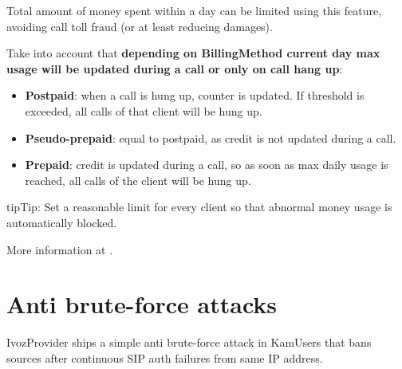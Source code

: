\documentclass[letterpaper,10pt,english]{sphinxmanual}
\begin{document}
Total amount of money spent within a day can be limited using this feature, avoiding call toll fraud (or at least
reducing damages).

Take into account that \textbf{depending on BillingMethod current day max usage will be updated during a call or only on call hang up}:
\begin{itemize}
\item {} 
\textbf{Postpaid}: when a call is hung up, counter is updated. If threshold is exceeded, all calls of that client will be hung up.

\item {} 
\textbf{Pseudo-prepaid}: equal to postpaid, as credit is not updated during a call.

\item {} 
\textbf{Prepaid}: credit is updated during a call, so as soon as max daily usage is reached, all calls of the client will be hung up.

\end{itemize}

\begin{notice}{tip}{Tip:}
Set a reasonable limit for every client so that abnormal money usage is automatically blocked.
\end{notice}

More information at {\hyperref[administration_portal/brand/billing/current_day_usages:current\string-day\string-usages]{}}.


\section{Anti brute-force attacks}
\label{security_and_maintenance/security/antibruteforce:anti-brute-force-attacks}\label{security_and_maintenance/security/antibruteforce::doc}
IvozProvider ships a simple anti brute-force attack in KamUsers that bans sources after continuous SIP auth failures
from same IP address.
\end{document}
